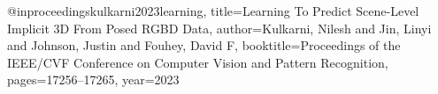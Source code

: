 @inproceedings{kulkarni2023learning,
  title={Learning To Predict Scene-Level Implicit 3D From Posed RGBD Data},
  author={Kulkarni, Nilesh and Jin, Linyi and Johnson, Justin and Fouhey, David F},
  booktitle={Proceedings of the IEEE/CVF Conference on Computer Vision and Pattern Recognition},
  pages={17256--17265},
  year={2023}
}